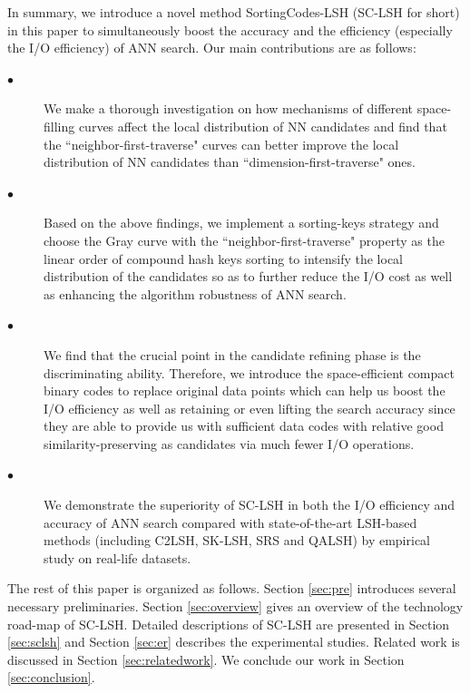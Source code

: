 \documentclass[twocolumn]{svjour3}          %
\begin{document}
In summary, we introduce a novel method SortingCodes-LSH (SC-LSH for short) in this paper to simultaneously boost the accuracy and the efficiency (especially the I/O efficiency) of ANN search. Our main contributions are as follows:
\begin{description}
	\item[$\bullet$] We make a thorough investigation on how mechanisms of different space-filling curves affect the local distribution of NN candidates and find that the ``neighbor-first-traverse" curves can better improve the local distribution of NN candidates than ``dimension-first-traverse" ones.
	\item[$\bullet$] Based on the above findings, we implement a sorting-keys strategy and choose the Gray curve with the ``neighbor-first-traverse" property as the linear order of compound hash keys sorting to intensify the local distribution of the candidates so as to further reduce the I/O cost as well as enhancing the algorithm robustness of ANN search.
	\item[$\bullet$] We find that the crucial point in the candidate refining phase is the discriminating ability. Therefore, we introduce the space-efficient compact binary codes to replace original data points which can help us boost the I/O efficiency as well as retaining or even lifting the search accuracy since they are able to provide us with sufficient data codes with relative good similarity-preserving as candidates via much fewer I/O operations.
	\item[$\bullet$] We demonstrate the superiority of SC-LSH in both the I/O efficiency and accuracy of ANN search  compared with state-of-the-art LSH-based methods (including C2LSH, SK-LSH, SRS and QALSH) by empirical study on real-life datasets. 
\end{description}



The rest of this paper is organized as follows. Section \ref{sec:pre} introduces several necessary preliminaries. Section \ref{sec:overview} gives an overview of the technology road-map of SC-LSH. Detailed descriptions of SC-LSH are presented in Section \ref{sec:sclsh} and Section \ref{sec:er} describes the experimental studies. Related work is discussed in Section \ref{sec:relatedwork}. We conclude our work in Section \ref{sec:conclusion}.
\end{document}

